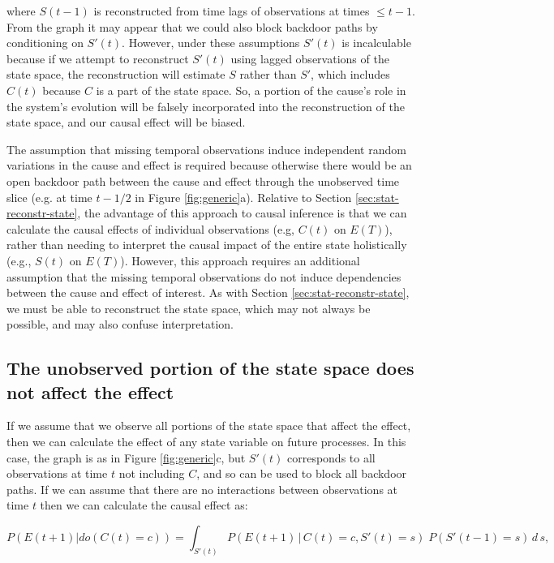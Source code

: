 \documentclass[12pt]{article}
\begin{document}
where $S(t-1)$ is reconstructed from time lags of observations at
times $\leq t-1$. From the graph it may appear that we could also
block backdoor paths by conditioning on $S'(t)$. However, under these
assumptions $S'(t)$ is incalculable because if we attempt to
reconstruct $S'(t)$ using lagged observations of the state space, the
reconstruction will estimate $S$ rather than $S'$, which includes
$C(t)$ because $C$ is a part of the state space. So, a portion of the
cause's role in the system's evolution will be falsely incorporated
into the reconstruction of the state space, and our causal effect will
be biased.

The assumption that missing temporal observations induce independent
random variations in the cause and effect is required because
otherwise there would be an open backdoor path between the cause and
effect through the unobserved time slice (e.g. at time $t-1/2$ in
Figure \ref{fig:generic}a). Relative to Section
\ref{sec:stat-reconstr-state}, the advantage of this approach to
causal inference is that we can calculate the causal effects of
individual observations (e.g, $C(t)$ on $E(T)$), rather than needing
to interpret the causal impact of the entire state holistically (e.g.,
$S(t)$ on $E(T)$). However, this approach requires an additional
assumption that the missing temporal observations do not induce
dependencies between the cause and effect of interest. As with Section
\ref{sec:stat-reconstr-state}, we must be able to reconstruct the
state space, which may not always be possible, and may also confuse
interpretation.


\subsection{The unobserved portion of the state space does not affect
  the effect}
\label{sec:observ-port-state}

If we assume that we observe all portions of the state space that
affect the effect, then we can calculate the effect of any state
variable on future processes. In this case, the graph is as in Figure
\ref{fig:generic}c, but $S'(t)$ corresponds to all observations at
time $t$ not including $C$, and so can be used to block all backdoor
paths. If we can assume that there are no interactions between
observations at time $t$ then we can calculate the causal effect as:

\begin{equation}
  P(E(t+1)| do(C(t)=c)) = \int_{S'(t)} P(E(t+1) \, | \, C(t)=c,
  S'(t) = s
  )\; P(S'(t-1)=s) \, d \, s,
\end{equation}
\end{document}
